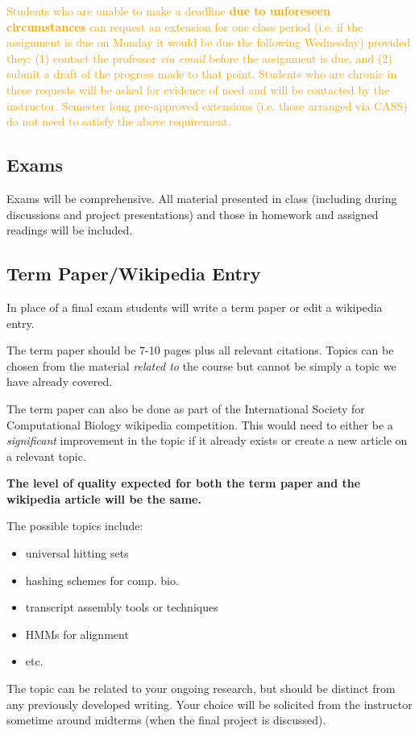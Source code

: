\documentclass[12pt]{scrartcl}
\newcommand{\add}[1]{\textcolor{orange}{#1}}
\begin{document}
\add{Students who are unable to make a deadline \textbf{due to unforeseen circumstances} can request an extension for one class period 
(i.e. if the assignment is due on Monday it would be due the following Wednesday) provided they: (1) contact the professor \emph{via email}
before the assignment is due, and (2) submit a draft of the progress made to that point. 
Students who are chronic in these requests will be asked for evidence of need and will be contacted by the instructor. 
Semester long pre-approved extensions (i.e. those arranged via CASS) do not need to satisfy the above requirement. 
} 

\subsection{Exams}

Exams will be comprehensive. 
All material presented in class (including during discussions and project presentations) 
and those in homework and assigned readings will be included.

\subsection{Term Paper/Wikipedia Entry}

In place of a final exam students will write a term paper or edit a wikipedia entry. 

The term paper should be 7-10 pages plus all relevant citations.
Topics can be chosen from the material \textit{related to} the course but cannot be simply a topic we have already covered. 

The term paper can also be done as part of the International Society for Computational Biology wikipedia competition.
This would need to either be a \textit{significant} improvement in the topic if it already exists or create a new article on a relevant topic. 

\textbf{The level of quality expected for both the term paper and the wikipedia article will be the same.}

The possible topics include: 
\begin{itemize}
\item universal hitting sets
\item hashing schemes for comp. bio. 
\item transcript assembly tools or techniques
\item HMMs for alignment
\item etc. 
\end{itemize}
The topic can be related to your ongoing research, but should be distinct from any previously developed writing. 
Your choice will be solicited from the instructor sometime around midterms (when the final project is discussed). 
\end{document}
